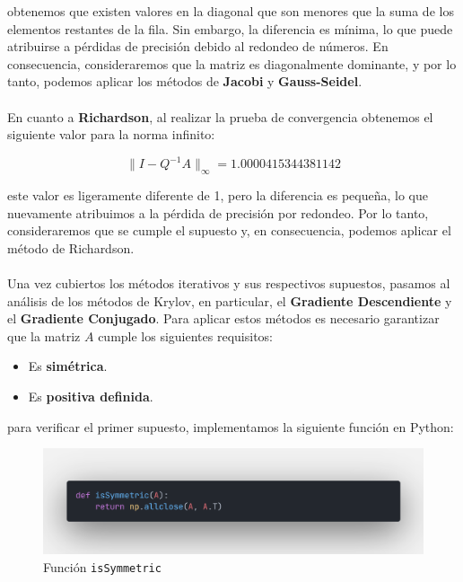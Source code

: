 \documentclass{article}
\begin{document}
  obtenemos que existen valores en la diagonal que son menores que la suma de los elementos restantes de la fila. Sin embargo, la diferencia es mínima, lo que puede atribuirse a pérdidas de precisión debido al redondeo de números. En consecuencia, consideraremos que la matriz es diagonalmente dominante, y por lo tanto, podemos aplicar los métodos de \textbf{Jacobi} y \textbf{Gauss-Seidel}.

  \paragraph{}
  En cuanto a \textbf{Richardson}, al realizar la prueba de convergencia obtenemos el siguiente valor para la norma infinito:

  \[
  \|I-Q^{-1}A\|_\infty = 1.0000415344381142
  \]

  este valor es ligeramente diferente de 1, pero la diferencia es pequeña, lo que nuevamente atribuimos a la pérdida de precisión por redondeo. Por lo tanto, consideraremos que se cumple el supuesto y, en consecuencia, podemos aplicar el método de Richardson.

  \paragraph{}
  Una vez cubiertos los métodos iterativos y sus respectivos supuestos, pasamos al análisis de los métodos de Krylov, en particular, el \textbf{Gradiente Descendiente} y el \textbf{Gradiente Conjugado}. Para aplicar estos métodos es necesario garantizar que la matriz $A$ cumple los siguientes requisitos:

  \begin{itemize}
      \item Es \textbf{simétrica}.
      \item Es \textbf{positiva definida}.
  \end{itemize}

  para verificar el primer supuesto, implementamos la siguiente función en Python:

  \begin{figure}[H]
      \centering
      \includegraphics[width=1\textwidth]{isSymmetric.png}
      \caption{Función \texttt{isSymmetric}}
  \end{figure}
\end{document}
